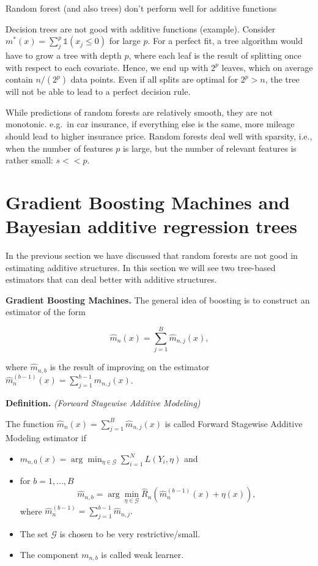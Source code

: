\documentclass[
]{book}
\begin{document}
Random forest (and also trees) don't perform well for additive functions

Decision trees are not good with additive functions (example). Consider \(m^\ast(x) = \sum_j^p \mathbb 1(x_j \leq 0)\) for large \(p\). For a perfect fit, a tree algorithm would have to grow a tree with depth \(p\),
where each leaf is the result of splitting once with respect to each covariate. Hence, we end up with \(2^p\) leaves, which on average contain \(n/(2^p)\) data points. Even if all splits are optimal for \(2^p>n\), the tree will not be able to lead to a perfect decision rule.

While predictions of random forests are relatively smooth, they are not monotonic. e.g.~in car insurance, if everything else is the same, more mileage should lead to higher insurance price. Random forests deal well with sparsity, i.e., when the number of features \(p\) is large, but the number of relevant features is rather small: \(s<<p\).

\hypertarget{gradient-boosting-machines-and-bayesian-additive-regression-trees}{%
\section{Gradient Boosting Machines and Bayesian additive regression trees}\label{gradient-boosting-machines-and-bayesian-additive-regression-trees}}

In the previous section we have discussed that random forests are not good in estimating additive structures. In this section we will see two tree-based estimators that can deal better with additive structures.

\textbf{Gradient Boosting Machines.} The general idea of boosting is to construct an estimator of the form

\[
\hat m_n(x)=\sum_{j=1}^B \hat m_{n,j}(x),
\]

where \(\hat m_{n,b}\) is the result of improving on the estimator \(\hat m_n^{(b-1)}(x)=\sum_{j=1}^{b-1} \hat m_{n,j}(x)\).

\textbf{Definition.} \emph{(Forward Stagewise Additive Modeling)}

The function \(\hat m_n(x)=\sum_{j=1}^B \hat m_{n,j}(x)\) is called Forward Stagewise Additive Modeling estimator if

\begin{itemize}
\item
  \(m_{n,0}(x)=\arg \min_{\eta\in \mathcal G} \sum_{i=1}^N L\left(Y_i, \eta\right)\) and
\item
  for \(b=1,\dots,B\)
  \[\hat m_{n,b} =  \arg \min_{\eta\in \mathcal G} \hat R_n\left( \hat m_n^{(b-1)}(x)+\eta(x)\right),\]
  where \(\hat m_n^{(b-1)}=\sum_{j=1}^{b-1}\hat m_{n,j}.\)
\item
  The set \(\mathcal G\) is chosen to be very restrictive/small.
\item
  The component \(m_{n,b}\) is called weak learner.
\end{itemize}
\end{document}

